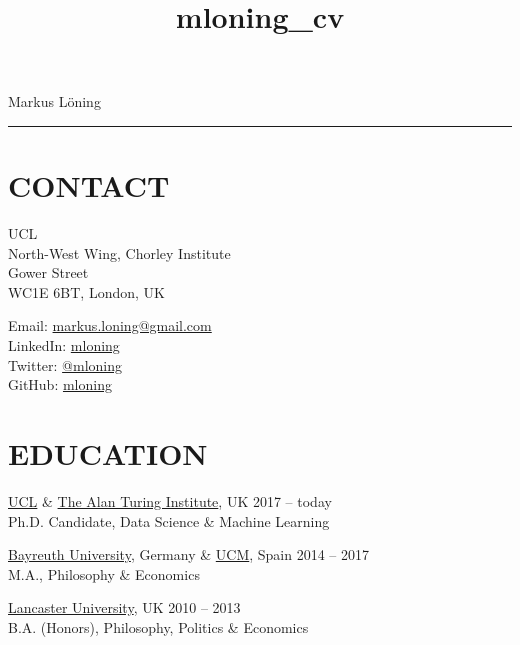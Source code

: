 \documentclass{cv}
\title{mloning_cv}
\begin{document}
{\LARGE Markus Löning}
\vspace{12pt}
\hrule

\section{CONTACT}

\begin{minipage}{.44\textwidth}
\vspace{3pt}
{\raggedright{} UCL \\
North-West Wing, Chorley Institute \\
Gower Street \\
WC1E 6BT, London, UK}
\end{minipage}
\hspace{1.25cm}
\begin{minipage}{.44\textwidth}
\vspace{3pt}
Email: \href{mailto:markus.loning@gmail.com}{markus.loning@gmail.com} \\
LinkedIn: \href{https://linkedin.com/in/mloning}{mloning} \\
Twitter: \href{https://twitter.com/mloning_}{@mloning\textunderscore} \\
GitHub: \href{https://github.com/mloning}{mloning}
\end{minipage}


\section{EDUCATION}

\href{https://www.ucl.ac.uk/}{UCL} \& \href{https://www.turing.ac.uk/}{The Alan Turing Institute}, UK \hfill 2017 -- today \\
Ph.D. Candidate, Data Science \& Machine Learning \hfill 
\vspace{15pt}

\href{https://www.uni-bayreuth.de/en/}{Bayreuth University}, Germany \& \href{https://www.ucm.es/english}{UCM}, Spain \hfill 2014 -- 2017 \\
M.A., Philosophy \& Economics \hfill 
\vspace{15pt}

\href{https://www.lancs.ac.uk/}{Lancaster University}, UK \hfill 2010 -- 2013 \\
B.A. (Honors), Philosophy, Politics \& Economics \hfill 
\end{document}
